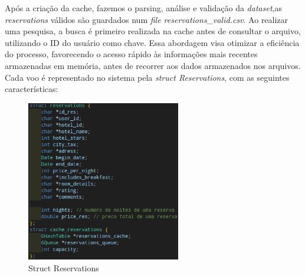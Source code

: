 \documentclass[11pt]{article}
\begin{document}
       Após a criação da cache, fazemos o parsing, análise e validação da \textit{dataset},as \textit{reservations} válidos são guardados num \textit{file reservations_valid.csv}. Ao realizar uma pesquisa, a busca é primeiro realizada na cache antes de consultar o arquivo, utilizando o ID do usuário como chave. Essa abordagem visa otimizar a eficiência do processo, favorecendo o acesso rápido às informações mais recentes armazenadas em memória, antes de recorrer aos dados armazenados nos arquivos.
    Cada voo é representado no sistema pela \textit{struct Reservations}, com as seguintes características:
    
    \begin{figure}[hbt!]
        \centering
        \includegraphics[width=0.6\textwidth]{Imagens/struct reservations.png}
        \caption{Struct Reservations}
        \label{fig:example}
    \end{figure}
    
    \newpage
    
\end{document}
